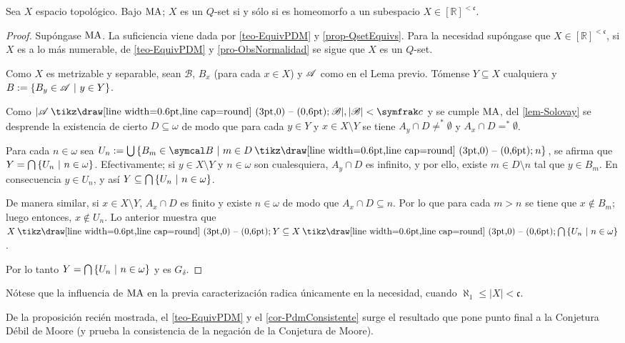     \begin{proposicion}\label{pro-MaQsetChar}
        Sea $X$ espacio topológico. Bajo $\operatorname{MA}$; $X$ es un $Q$-set si y sólo si es homeomorfo a un subespacio $X \in [\mathbb{R}]^{<\mathfrak{c}}$.
    \end{proposicion}
        \begin{proof}
            Supóngase $\operatorname{MA}$. La suficiencia viene dada por \ref{teo-EquivPDM} y \ref{prop-QsetEquivs}. Para la necesidad supóngase que $X \in [\mathbb{R}]^{<\mathfrak{c}}$, si $X$ es a lo más numerable, de \ref{teo-EquivPDM} y \ref{pro-ObsNormalidad} se sigue que $X$ es un $Q$-set.

            Como $X$ es metrizable y separable, sean $\mathcal{B}$, $B_x$ (para cada $x \in X$) y $\mathscr{A}$ como en el Lema previo. Tómense $Y \subseteq X$ cualquiera y $B:=\{B_y \in \mathscr{A} \text{ $|$ } y \in Y\}$.

            Como $|\ms{A} \setminus \ms{B}|,|\ms{B}|<\mathfrak{c}$ y se cumple $\operatorname{MA}$, del \autoref{lem-Solovay} se desprende la existencia de cierto $D \subseteq \omega$ de modo que para cada $y \in Y$ y $x \in X \setminus Y$ se tiene $A_y \cap D\neq ^*\emptyset$ y $A_x \cap D= ^*\emptyset$.

            Para cada $n \in \omega$ sea $U_n:=\midcup\{ B_m \in \mathcal{B} \tq m \in D \setminus n \}$, se afirma que $Y=\mbox{$\bigcap$}\,\{U_n \text{ $|$ } n \in \omega\}$. Efectivamente; si $y \in X \setminus Y$ y $n \in \omega$ son cualesquiera, $A_y \cap D$ es infinito, y por ello, existe $m \in D \setminus n$ tal que $y \in B_m$. En consecuencia $y \in U_n$, y así $Y \subseteq \mbox{$\bigcap$}\,\{U_n \text{ $|$ } n \in \omega\}$.

            De manera similar, si $x \in X \setminus Y$, $A_x \cap D$ es finito y existe $n \in \omega$ de modo que $A_x \cap D \subseteq n$. Por lo que para cada $m > n$ se tiene que $x \notin B_m$; luego entonces, $x \notin U_n$. Lo anterior muestra que $X \setminus Y \subseteq X \setminus \midcap\{U_n \tq n \in \omega\}$.

            Por lo tanto $Y=\mbox{$\bigcap$}\,\{U_n \text{ $|$ } n \in \omega\}$ y es $G_\delta$.
        \end{proof}

        Nótese que la influencia de $\operatorname{MA}$ en la previa caracterización radica únicamente en la necesidad, cuando $\aleph_1 \leq |X| < \mathfrak{c}$.

        De la proposición recién mostrada, el \autoref{teo-EquivPDM} y el \autoref{cor-PdmConsistente} surge el resultado que pone punto final a la Conjetura Débil de Moore (y prueba la consistencia de la negación de la Conjetura de Moore).

